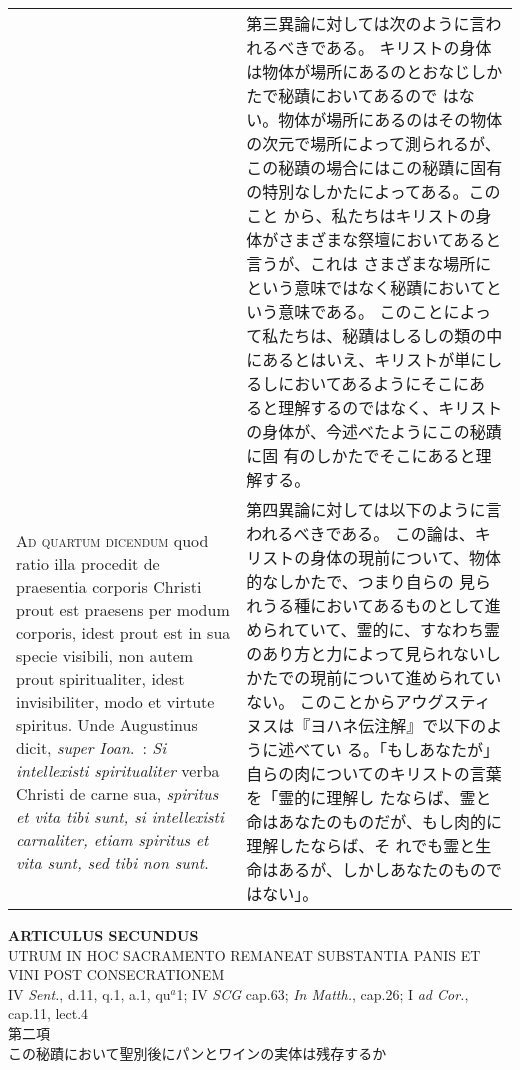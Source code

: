 \documentclass[10pt]{jsarticle} %
\begin{document}
\begin{longtable}{p{21em}p{21em}}
&

第三異論に対しては次のように言われるべきである。
キリストの身体は物体が場所にあるのとおなじしかたで秘蹟においてあるので
 はない。物体が場所にあるのはその物体の次元で場所によって測られるが、
 この秘蹟の場合にはこの秘蹟に固有の特別なしかたによってある。このこと
 から、私たちはキリストの身体がさまざまな祭壇においてあると言うが、これは
 さまざまな場所にという意味ではなく秘蹟においてという意味である。
このことによって私たちは、秘蹟はしるしの類の中にあるとはいえ、キリストが単にしるしにおいてあるようにそこにあ
 ると理解するのではなく、キリストの身体が、今述べたようにこの秘蹟に固
 有のしかたでそこにあると理解する。


\\




{\scshape Ad quartum dicendum} quod ratio illa procedit de praesentia corporis
Christi prout est praesens per modum corporis, idest prout est in sua
specie visibili, non autem prout spiritualiter, idest invisibiliter,
modo et virtute spiritus. Unde Augustinus dicit, {\itshape super
 Ioan}.~: {\itshape Si
intellexisti spiritualiter} verba Christi de carne sua, {\itshape spiritus et
vita tibi sunt, si intellexisti carnaliter, etiam spiritus et vita
sunt, sed tibi non sunt}.

&

第四異論に対しては以下のように言われるべきである。
この論は、キリストの身体の現前について、物体的なしかたで、つまり自らの
 見られうる種においてあるものとして進められていて、霊的に、すなわち霊
 のあり方と力によって見られないしかたでの現前について進められていない。
 このことからアウグスティヌスは『ヨハネ伝注解』で以下のように述べてい
 る。「もしあなたが」自らの肉についてのキリストの言葉を「霊的に理解し
 たならば、霊と命はあなたのものだが、もし肉的に理解したならば、そ
 れでも霊と生命はあるが、しかしあなたのものではない」。


\end{longtable}
\newpage

\begin{center}
{\Large {\bf ARTICULUS SECUNDUS}}\\
{\large UTRUM IN HOC SACRAMENTO REMANEAT SUBSTANTIA PANIS ET VINI POST
 CONSECRATIONEM}\\
{\footnotesize IV {\itshape Sent.}, d.11, q.1, a.1, qu$^{a}$1; IV
 {\itshape SCG} cap.63; {\itshape In Matth.}, cap.26; I
 {\itshape ad Cor.}, cap.11, lect.4}\\
{\Large 第二項\\この秘蹟において聖別後にパンとワインの実体は残存するか}
\end{center}
\end{document}
